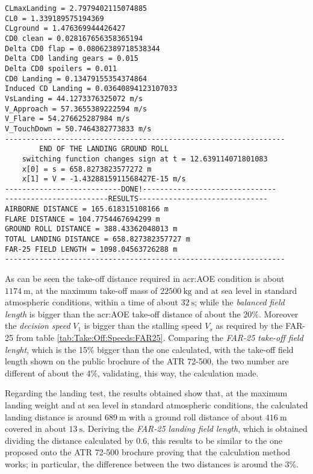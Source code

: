 \bigskip
\begin{lstlisting}[caption={ATR-72 landing test results}, captionpos=b, tabsize=2]
CLmaxLanding = 2.7979402115074885
CL0 = 1.339189575194369
CLground = 1.476369944426427
CD0 clean = 0.028167656358365194
Delta CD0 flap = 0.08062389718538344
Delta CD0 landing gears = 0.015
Delta CD0 spoilers = 0.011
CD0 Landing = 0.13479155354374864
Induced CD Landing = 0.03640894123107033
VsLanding = 44.1273376325072 m/s
V_Approach = 57.3655389222594 m/s
V_Flare = 54.276625287984 m/s
V_TouchDown = 50.7464382773833 m/s
-----------------------------------------------------------------
		END OF THE LANDING GROUND ROLL
	switching function changes sign at t = 12.639114071801083
	x[0] = s = 658.8273823577272 m
	x[1] = V = -1.4328815911568427E-15 m/s
---------------------------DONE!-------------------------------
------------------------RESULTS------------------------------
AIRBORNE DISTANCE = 165.618315108166 m
FLARE DISTANCE = 104.7754467694299 m
GROUND ROLL DISTANCE = 388.43362048013 m
TOTAL LANDING DISTANCE = 658.827382357727 m
FAR-25 FIELD LENGTH = 1098.04563726288 m
-----------------------------------------------------------------
\end{lstlisting}
%
As can be seen the take-off distance required in \gls{acr:AOE} condition is about $\SI{1174}{\meter}$, at the maximum take-off mass of $\SI{22500}{\kilogram}$ and at sea level in standard atmospheric conditions, within a time of about $\SI{32}{\second}$; while the \emph{balanced field length} is bigger than the \gls{acr:AOE} take-off distance of about the 20\%. Moreover the \emph{decision speed} $V_1$ is bigger than the stalling speed $V_s$ as required by the \gls{FAR}-25 from table \ref{tab:Take:Off:Speeds:FAR25}. Comparing the \emph{FAR-25 take-off field lenght}, which is the 15\% bigger than the one calculated, with the take-off field length shown on the public brochure of the ATR 72-500, the two number are different of about the 4\%, validating, this way, the calculation made.  

\bigskip
\noindent
Regarding the landing test, the results obtained show that, at the maximum landing weight and at sea level in standard atmospheric conditions, the calculated landing distance is around $\SI{689}{\meter}$ with a ground roll distance of about $\SI{416}{\meter}$ covered in about $\SI{13}{\second}$. Deriving the \emph{FAR-25 landing field length}, which is obtained dividing the distance calculated by 0.6, this results to be similar to the one proposed onto the ATR 72-500 brochure proving that the calculation method works; in particular, the difference between the two distances is around the 3\%.

